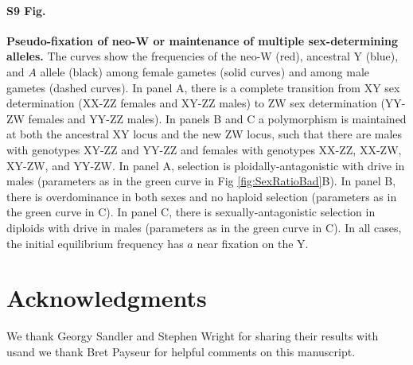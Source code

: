\documentclass[10pt,letterpaper]{article}
\providecommand{\DIFaddtex}[1]{{\protect\color{blue}\uwave{#1}}} %
\providecommand{\DIFaddbegin}{} %
\providecommand{\DIFaddend}{} %
\providecommand{\DIFdelbegin}{} %
\providecommand{\DIFdelend}{} %
\providecommand{\DIFadd}[1]{\texorpdfstring{\DIFaddtex{#1}}{#1}} %
\newcommand{\DIFscaledelfig}{0.5}
\newlength{\DIFdelgraphicswidth} %
\newlength{\DIFdelgraphicsheight} %
\newcommand{\DIFaddincludegraphics}[2][]{{\color{blue}\fbox{\DIFOincludegraphics[#1]{#2}}}} %
\newcommand{\DIFdelincludegraphics}[2][]{%
\sbox{\DIFdelgraphicsbox}{\DIFOincludegraphics[#1]{#2}}%
\settoboxwidth{\DIFdelgraphicswidth}{\DIFdelgraphicsbox} %
\settoboxtotalheight{\DIFdelgraphicsheight}{\DIFdelgraphicsbox} %
\scalebox{\DIFscaledelfig}{%
\parbox[b]{\DIFdelgraphicswidth}{\usebox{\DIFdelgraphicsbox}\\[-\baselineskip] \rule{\DIFdelgraphicswidth}{0em}}\llap{\resizebox{\DIFdelgraphicswidth}{\DIFdelgraphicsheight}{%
\setlength{\unitlength}{\DIFdelgraphicswidth}%
\begin{picture}(1,1)%
\thicklines\linethickness{2pt} %
{\color[rgb]{1,0,0}\put(0,0){\framebox(1,1){}}}%
{\color[rgb]{1,0,0}\put(0,0){\line( 1,1){1}}}%
{\color[rgb]{1,0,0}\put(0,1){\line(1,-1){1}}}%
\end{picture}%
}\hspace*{3pt}}} %
} %
\DeclareRobustCommand{\DIFaddbegin}{\DIFOaddbegin \let\includegraphics\DIFaddincludegraphics} %
\DeclareRobustCommand{\DIFaddend}{\DIFOaddend \let\includegraphics\DIFOincludegraphics} %
\DeclareRobustCommand{\DIFdelbegin}{\DIFOdelbegin \let\includegraphics\DIFdelincludegraphics} %
\DeclareRobustCommand{\DIFdelend}{\DIFOaddend \let\includegraphics\DIFOincludegraphics} %
\begin{document}
\paragraph*{S9 Fig.}
\label{fig:freqAll}
{\bf Pseudo-fixation of neo-W or maintenance of multiple sex-determining alleles. }
The curves show the frequencies of the neo-W (red), ancestral Y (blue), and $A$ allele (black) among female gametes (solid curves) and among male gametes (dashed curves). 
In panel A, there is a complete transition from XY sex determination (XX-ZZ females and XY-ZZ males) to ZW sex determination (YY-ZW females and YY-ZZ males).  
In panels B and C a polymorphism is maintained at both the ancestral XY locus and the new ZW locus, such that there are males with genotypes XY-ZZ and YY-ZZ and females with genotypes XX-ZZ, XX-ZW, XY-ZW, and YY-ZW. 
In panel A, selection is ploidally-antagonistic with drive in males (parameters as in the green curve in Fig \ref{fig:SexRatioBad}B).
In panel B, there is overdominance in both sexes and no haploid selection (parameters as in the green curve in C).
In panel C, there is sexually-antagonistic selection in diploids with drive in males (parameters as in the green curve in C).
In all cases, the initial equilibrium frequency has $a$ near fixation on the Y.

\section*{Acknowledgments}
We thank Georgy Sandler and Stephen Wright for sharing their results with us\DIFaddbegin \DIFadd{, }\DIFaddend and we thank Bret Payseur \DIFaddbegin \DIFadd{and three anonymous reviewers }\DIFaddend for helpful comments on this manuscript. 

\nolinenumbers

%
%
% 
\DIFdelbegin %
\DIFdelend \DIFaddbegin 
\DIFaddend 
\end{document}
